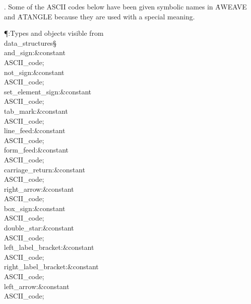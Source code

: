 . Some of the ASCII codes below  have been given symbolic names
in
\.{AWEAVE} and \.{ATANGLE} because they are used with a special meaning.

\Y\P\?\4:Types and objects visible from \\{data\_structures}\X\mathrel{+}\S%
\?\6
\\{and\_sign}\?:\?\&{constant}\8\\{ASCII\_code}\?\K{}\?;\6
\\{not\_sign}\?:\?\&{constant}\8\\{ASCII\_code}\?\K{}\?;\6
\\{set\_element\_sign}\?:\?\&{constant}\8\\{ASCII\_code}\?\K{}\?;%
\6
\\{tab\_mark}\?:\?\&{constant}\8\\{ASCII\_code}\?\K{}\?;\6
\\{line\_feed}\?:\?\&{constant}\8\\{ASCII\_code}\?\K{}\?;\6
\\{form\_feed}\?:\?\&{constant}\8\\{ASCII\_code}\?\K{}\?;\6
\\{carriage\_return}\?:\?\&{constant}\8\\{ASCII\_code}\?\K{}\?;\6
\\{right\_arrow}\?:\?\&{constant}\8\\{ASCII\_code}\?\K{}\?;%
\6
\\{box\_sign}\?:\?\&{constant}\8\\{ASCII\_code}\?\K{}\?;\6
\\{double\_star}\?:\?\&{constant}\8\\{ASCII\_code}\?\K{}\?;%
\6
\\{left\_label\_bracket}\?:\?\&{constant}\8\\{ASCII\_code}\?\K{}\?;%
\6
\\{right\_label\_bracket}\?:\?\&{constant}\8\\{ASCII\_code}\?\K{}\?;%
\6
\\{left\_arrow}\?:\?\&{constant}\8\\{ASCII\_code}\?\K{}\?;\6
